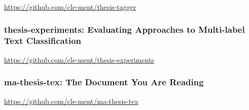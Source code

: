 \url{https://github.com/cle-ment/thesis-tagger}

\subsubsection*{thesis-experiments: Evaluating Approaches to Multi-label Text Classification}
\label{sub:thesis-experiments: Evaluating Approaches to Multi-label Text Classification}


\url{https://github.com/cle-ment/thesis-experiments}

\subsubsection*{ma-thesis-tex: The Document You Are Reading}
\label{sub:ma-thesis-tex: The Document You Are Reading}

\url{https://github.com/cle-ment/ma-thesis-tex}
